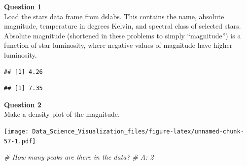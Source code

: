 \documentclass[
]{article}
\newenvironment{Shaded}{\begin{snugshade}}{\end{snugshade}}
\newcommand{\CommentTok}[1]{\textcolor[rgb]{0.56,0.35,0.01}{\textit{#1}}}
\newcommand{\KeywordTok}[1]{\textcolor[rgb]{0.13,0.29,0.53}{\textbf{#1}}}
\newcommand{\NormalTok}[1]{#1}
\newcommand{\OperatorTok}[1]{\textcolor[rgb]{0.81,0.36,0.00}{\textbf{#1}}}
\newcommand{\StringTok}[1]{\textcolor[rgb]{0.31,0.60,0.02}{#1}}
\begin{document}
\textbf{Question 1}\\
Load the stars data frame from dslabs. This contains the name, absolute
magnitude, temperature in degrees Kelvin, and spectral class of selected
stars. Absolute magnitude (shortened in these problems to simply
``magnitude'') is a function of star luminosity, where negative values
of magnitude have higher luminosity.

\begin{Shaded}
\end{Shaded}

\begin{verbatim}
## [1] 4.26
\end{verbatim}

\begin{Shaded}
\end{Shaded}

\begin{verbatim}
## [1] 7.35
\end{verbatim}

\textbf{Question 2}\\
Make a density plot of the magnitude.

\begin{Shaded}
\end{Shaded}

\texttt{[image: Data\_Science\_Visualization\_files/figure-latex/unnamed-chunk-57-1.pdf]}

\begin{Shaded}
\begin{Highlighting}[]
\CommentTok{# How many peaks are there in the data?}
\CommentTok{# A: 2}
\end{Highlighting}
\end{Shaded}
\end{document}
